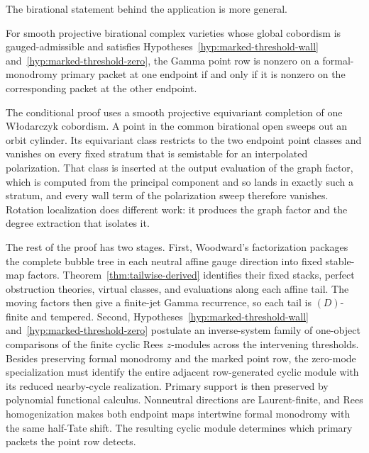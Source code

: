 The birational statement behind the application is more general.

\begin{theorem}
\label{thm:intro-birational-conditional}
For smooth projective birational complex varieties whose global cobordism
is gauged-admissible and satisfies
Hypotheses~\ref{hyp:marked-threshold-wall}
and~\ref{hyp:marked-threshold-zero}, the Gamma point row is nonzero on a
formal-monodromy primary packet at one endpoint if and only if it is nonzero
on the corresponding packet at the other endpoint.
\end{theorem}

The conditional proof uses a smooth projective equivariant completion of one
W{\l}odarczyk cobordism.  A point in the common birational open sweeps out an
orbit cylinder.  Its equivariant class restricts to the two endpoint point
classes and vanishes on every fixed stratum that is semistable for an
interpolated polarization.  That class is inserted at the output evaluation of
the graph factor, which is computed from the principal component and so lands
in exactly such a stratum, and every wall term of the polarization sweep
therefore vanishes.  Rotation localization does different work: it produces
the graph factor and the degree extraction that isolates it.

The rest of the proof has two stages.  First, Woodward's factorization
packages the complete bubble tree in each neutral affine gauge direction into
fixed stable-map factors.  Theorem~\ref{thm:tailwise-derived} identifies
their fixed stacks, perfect obstruction theories, virtual classes, and
evaluations along each affine tail.  The moving factors then give a finite-jet
Gamma recurrence, so each tail is \((D)\)-finite and tempered.  Second,
Hypotheses~\ref{hyp:marked-threshold-wall}
and~\ref{hyp:marked-threshold-zero} postulate an inverse-system family of
one-object comparisons of the finite cyclic Rees \(z\)-modules across the intervening
thresholds.  Besides preserving formal monodromy and the marked point row,
the zero-mode specialization must identify the entire adjacent row-generated
cyclic module with its reduced nearby-cycle realization.  Primary support is
then preserved by polynomial functional calculus.  Nonneutral directions are Laurent-finite,
and Rees homogenization makes both endpoint maps intertwine formal monodromy
with the same half-Tate shift.  The resulting cyclic module determines which
primary packets the point row detects.

